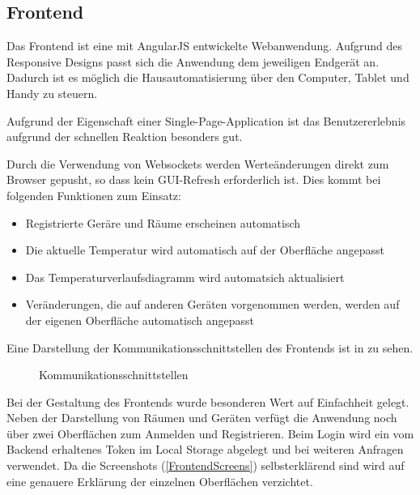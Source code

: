 \subsection{Frontend}
Das Frontend ist eine mit AngularJS entwickelte Webanwendung. Aufgrund des Responsive Designs passt sich die Anwendung dem jeweiligen Endgerät an. Dadurch ist es möglich die Hausautomatisierung über den Computer, Tablet und Handy zu steuern. 

Aufgrund der Eigenschaft einer Single-Page-Application ist das Benutzererlebnis aufgrund der schnellen Reaktion besonders gut. 

Durch die Verwendung von Websockets werden Werteänderungen direkt zum Browser gepusht, so dass kein GUI-Refresh erforderlich ist. Dies kommt bei folgenden Funktionen zum Einsatz:

\begin{itemize}
\item Registrierte Geräre und Räume erscheinen automatisch
\item Die aktuelle Temperatur wird automatisch auf der Oberfläche angepasst
\item Das Temperaturverlaufsdiagramm wird automatsich aktualisiert
\item Veränderungen, die auf anderen Geräten vorgenommen werden, werden auf der eigenen Oberfläche automatisch angepasst
\end{itemize}

Eine Darstellung der Kommunikationsschnittstellen des Frontends ist in  zu sehen.

\begin{figure}[H]
\centering
{}
\caption{Kommunikationsschnittstellen}
\label{fig:Com_tech_fr}
\end{figure}

Bei der Gestaltung des Frontends wurde besonderen Wert auf Einfachheit gelegt. Neben der Darstellung von Räumen und Geräten verfügt die Anwendung noch über zwei Oberflächen zum Anmelden und Registrieren.
Beim Login wird ein vom Backend erhaltenes Token im Local Storage abgelegt und bei weiteren Anfragen verwendet. Da die Screenshots (\autoref{FrontendScreens}) selbsterklärend sind wird auf eine genauere Erklärung der einzelnen Oberflächen verzichtet.


